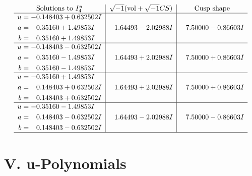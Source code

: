 \documentclass[1p]{elsarticle_modified}
\theoremstyle{definition}
\newcommand{\I}{\sqrt{-1}}
\begin{document}
$$\begin{array}{c|c|c}  
\text{Solutions to }I^u_{4}& \I (\text{vol} + \sqrt{-1}CS) & \text{Cusp shape}\\
 \hline 
\begin{aligned}
u &= -0.148403 + 0.632502 I \\
a &= \phantom{-}0.35160 + 1.49853 I \\
b &= \phantom{-}0.35160 + 1.49853 I\end{aligned}
 & \phantom{-}1.64493 - 2.02988 I & \phantom{-}7.50000 - 0.86603 I \\ \hline\begin{aligned}
u &= -0.148403 - 0.632502 I \\
a &= \phantom{-}0.35160 - 1.49853 I \\
b &= \phantom{-}0.35160 - 1.49853 I\end{aligned}
 & \phantom{-}1.64493 + 2.02988 I & \phantom{-}7.50000 + 0.86603 I \\ \hline\begin{aligned}
u &= -0.35160 + 1.49853 I \\
a &= \phantom{-}0.148403 + 0.632502 I \\
b &= \phantom{-}0.148403 + 0.632502 I\end{aligned}
 & \phantom{-}1.64493 + 2.02988 I & \phantom{-}7.50000 + 0.86603 I \\ \hline\begin{aligned}
u &= -0.35160 - 1.49853 I \\
a &= \phantom{-}0.148403 - 0.632502 I \\
b &= \phantom{-}0.148403 - 0.632502 I\end{aligned}
 & \phantom{-}1.64493 - 2.02988 I & \phantom{-}7.50000 - 0.86603 I\\
 \hline 
 \end{array}$$\newpage
\newpage\renewcommand{\arraystretch}{1}
\centering \section*{ V. u-Polynomials}
\end{document}
